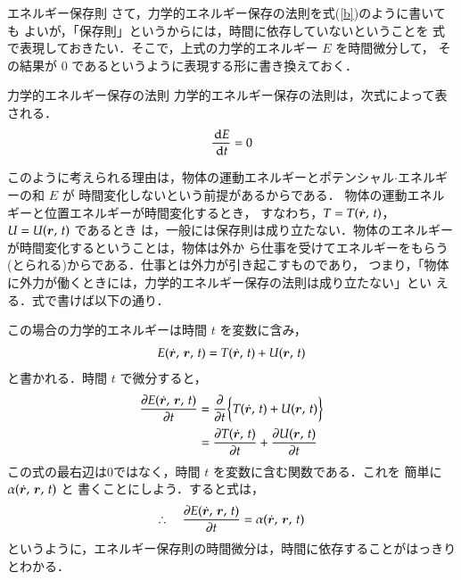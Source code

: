             \begin{mysmallsec}{エネルギー保存則}
                さて，力学的エネルギー保存の法則を式(\ref{b})のように書いても
                よいが，「保存則」というからには，時間に依存していないということを
                式で表現しておきたい．そこで，上式の力学的エネルギー $E$ を時間微分して，
                その結果が 0 であるというように表現する形に書き換えておく．
                            \begin{myshadebox}{力学的エネルギー保存の法則}
                                力学的エネルギー保存の法則は，次式によって表される．
                                \begin{align}
                                    \frac{\,\mathrm{d} E}{\,\mathrm{d} t}=0
                                \end{align}
                            \end{myshadebox}

                このように考えられる理由は，物体の運動エネルギーとポテンシャル$\cdot$エネルギーの和 $E$ が
                時間変化しないという前提があるからである．
                物体の運動エネルギーと位置エネルギーが時間変化するとき，
                すなわち，$T=T(\dot{\boldsymbol{r}},\,t)$，$U=U(\boldsymbol{r},\,t)$ であるとき
                は，一般には保存則は成り立たない．物体のエネルギーが時間変化するということは，物体は外か
                ら仕事を受けてエネルギーをもらう(とられる)からである．仕事とは外力が引き起こすものであり，
                つまり，「物体に外力が働くときには，力学的エネルギー保存の法則は成り立たない」とい
                える．式で書けば以下の通り．

                この場合の力学的エネルギーは時間 $t$ を変数に含み，
                \begin{align}
                E(\dot{\boldsymbol{r}},\,\boldsymbol{r},\,t)
                =T(\dot{\boldsymbol{r}},\,t)+U(\boldsymbol{r},\,t)
                \end{align}
                と書かれる．時間 $t$ で微分すると，
                \begin{align*}
                \frac{\partial E(\dot{\boldsymbol{r}},\,\boldsymbol{r},\,t)}{\partial t}
                &=\frac{\partial }{\partial t}\biggl\{ T(\dot{\boldsymbol{r}},\,t)+ U(\boldsymbol{r},\,t)\biggr\} \\
                &=\frac{\partial T(\dot{\boldsymbol{r}},\,t)}{\partial t}+\frac{\partial U(\boldsymbol{r},\,t)}{\partial t}
                \end{align*}
                この式の最右辺は0ではなく，時間 $t$ を変数に含む関数である．これを
                簡単に $\alpha (\dot{\boldsymbol{r}},\,\boldsymbol{r},\,t)$ と
                書くことにしよう．すると式は，
                \begin{align}
                \therefore \quad
                \frac{\partial E(\dot{\boldsymbol{r}},\,\boldsymbol{r},\,t)}{\partial t}
                =\alpha (\dot{\boldsymbol{r}},\,\boldsymbol{r},\,t)
                \end{align}
                というように，エネルギー保存則の時間微分は，時間に依存することがはっきりとわかる．


\end{mysmallsec}
